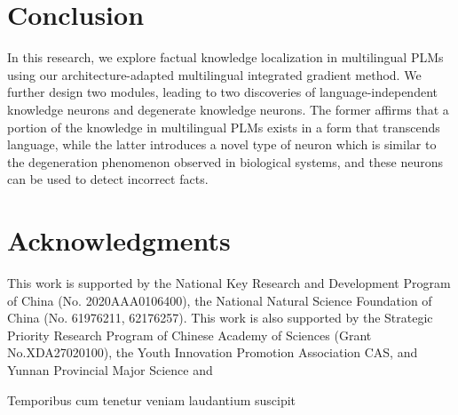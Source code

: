 \documentclass[]{article}
\begin{document}
\section{Conclusion}
In this research, we explore factual knowledge localization in multilingual PLMs using our architecture-adapted multilingual integrated gradient method. We further design two modules, leading to two discoveries of language-independent knowledge neurons and degenerate knowledge neurons. The former affirms that a portion of the knowledge in multilingual PLMs exists in a form that transcends language, while the latter introduces a novel type of neuron which is similar to the degeneration phenomenon observed in biological systems, and these neurons can be used to detect incorrect facts.

\section*{Acknowledgments}
This work is supported by the National Key Research and Development Program of China (No. 2020AAA0106400), the National Natural Science Foundation of China (No. 61976211, 62176257). This work is also supported by the Strategic Priority Research Program of Chinese Academy of Sciences (Grant No.XDA27020100), the Youth Innovation Promotion Association CAS, and Yunnan Provincial Major Science and

Temporibus cum tenetur veniam laudantium suscipit

\end{document}
